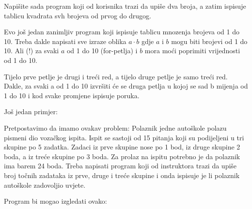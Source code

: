 Napišite sada program koji od korisnika trazi da upiše dva broja, a
zatim ispisuje tablicu kvadrata svh brojeva od prvog do drugog.

Evo još jedan zanimljiv program koji ispisuje tablicu mnozenja brojeva od
1 do 10. Treba dakle napisati sve izraze oblika $a\cdot b$ gdje $a$ i $b$
mogu biti brojevi od 1 do 10. Ali (!) za svaki $a$ od 1 do 10 (for-petlja)
i $b$ mora moći poprimiti vrijednosti od 1 do 10.


Tijelo prve petlje je drugi i treći red, a tijelo druge petlje je samo
treći red. Dakle, za svaki a od 1 do 10 izvršiti će se druga petlja u
kojoj se sad b mijenja od 1 do 10 i kod svake promjene ispisuje poruka.

Još jedan primjer:

Pretpostavimo da imamo ovakav problem:
Polaznik jedne autoškole polazu pismeni dio vozačkog ispita.
Ispit se sastoji od 15 pitanja koji su podijeljeni u tri skupine po 5 zadatka.
Zadaci iz prve skupine nose po 1 bod, iz druge skupine 2 boda, a iz treće
skupine po 3 boda. Za prolaz na ispitu potrebno je da polaznik ima barem 24 boda.
Treba napisati program koji od instruktora trazi da upiše broj točnih
zadataka iz prve, druge i treće skupine i onda ispisuje je li polaznik
autoškole zadovoljio uvjete.

Program bi mogao izgledati ovako:


